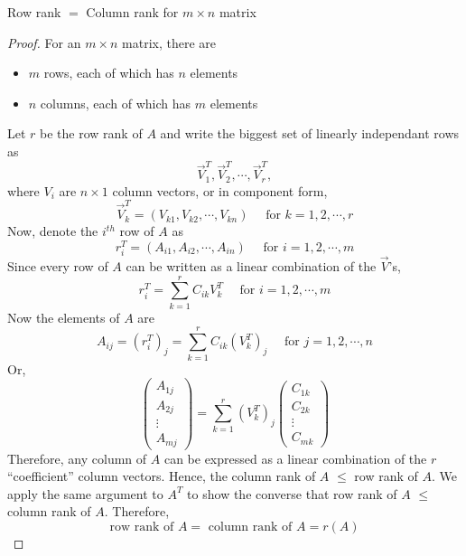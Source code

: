 \documentclass{article}
\numberwithin{equation}{section}
\begin{document}
\begin{thm}
    Row rank $=$ Column rank for $m \times n$ matrix
\end{thm}
\begin{proof}
    For an $m \times n$ matrix, there are
    \begin{itemize}
        \item $m$ rows, each of which has $n$ elements
        \item $n$ columns, each of which has $m$ elements
    \end{itemize}

    Let $r$ be the row rank of $A$ and write the biggest set of linearly independant rows as
    \[
        \vec V_1^T, \vec V_2^T, \cdots, \vec V_r^T,   
    \]
    where $V_i$ are $n \times 1$ column vectors, or in component form,
    \[
        \vec V_k^T = (V_{k1}, V_{k2}, \cdots, V_{kn}) \quad \text{ for } k = 1, 2, \cdots, r
    \]
    Now, denote the $i^{th}$ row of $A$ as
    \[
        r_i^T = (A_{i1}, A_{i2}, \cdots, A_{in}) \quad \text{ for } i = 1, 2, \cdots, m
    \]
    Since every row of $A$ can be written as a linear combination of the $\vec V$'s,
    \[
        r_i^T = \sum_{k=1}^{r} C_{ik} V^T_k \quad \text{ for } i = 1, 2, \cdots, m
    \]
    Now the elements of $A$ are
    \[
        A_{ij} = (r_i^T)_j = \sum_{k=1}^{r} C_{ik} (V^T_k)_j  \quad \text{ for } j = 1, 2, \cdots, n
    \]
    Or, 
    \[
        \begin{pmatrix}
            A_{1j} \\ A_{2j} \\ \vdots \\ A_{mj}
        \end{pmatrix}
        =
        \sum_{k=1}^{r} (V^T_k)_j \begin{pmatrix}
            C_{1k} \\ C_{2k} \\ \vdots \\ C_{mk}
        \end{pmatrix}
    \]
    Therefore, any column of $A$ can be expressed as a linear combination of the $r$ ``coefficient'' column vectors.
    Hence, the column rank of $A$ $\leq$ row rank of $A$. 
    We apply the same argument to $A^T$ to show the converse that row rank of $A$ $\leq$ column rank of $A$.
    Therefore, 
    \[
        \text{row rank of } A = \text{ column rank of } A = r(A) 
    \]
\end{proof}

\end{document}
